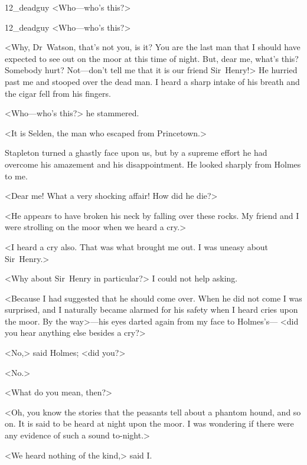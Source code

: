 \begin{letter}
	\begin{bwbigpic}
			[1.0] 
		{12_deadguy}
		{<Who—who's this?>}
	\end{bwbigpic}
\end{letter}
\begin{a4}
	\begin{bwbigpic}
			[1.0]  
		{12_deadguy}
		{<Who—who's this?>}
	\end{bwbigpic}
\end{a4}


<Why, Dr~Watson, that's not you, is it? You are the last man that I should have expected to see out on the moor at this time of night. But, dear me, what's this? Somebody hurt? Not—don't tell me that it is our friend Sir~Henry!> He hurried past me and stooped over the dead man. I heard a sharp intake of his breath and the cigar fell from his fingers.

<Who—who's this?> he stammered.

<It is Selden, the man who escaped from Princetown.>

Stapleton turned a ghastly face upon us, but by a supreme effort he had overcome his amazement and his disappointment. He looked sharply from Holmes to me.

<Dear me! What a very shocking affair! How did he die?>

<He appears to have broken his neck by falling over these rocks. My friend and I were strolling on the moor when we heard a cry.>

<I heard a cry also. That was what brought me out. I was uneasy about Sir~Henry.>

<Why about Sir~Henry in particular?> I could not help asking.

<Because I had suggested that he should come over. When he did not come I was surprised, and I naturally became alarmed for his safety when I heard cries upon the moor. By the way>—his eyes darted again from my face to Holmes's— <did you hear anything else besides a cry?>

<No,> said Holmes; <did you?>

<No.>

<What do you mean, then?>

<Oh, you know the stories that the peasants tell about a phantom hound, and so on. It is said to be heard at night upon the moor. I was wondering if there were any evidence of such a sound to-night.>

<We heard nothing of the kind,> said I\@.

